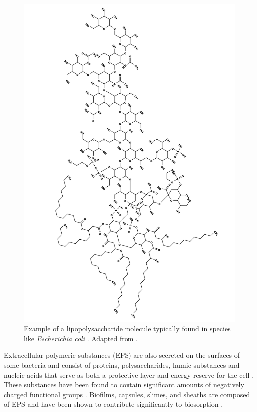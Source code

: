 \begin{figure}[tbph!]
	\centering
	\includegraphics[width=0.9\linewidth]{Theory/Pics/lps}
	\caption{Example of a lipopolysaccharide molecule typically found in species like \textit{Escherichia coli} \parencite{Whitman2010}. Adapted from \textcite{NCIB_lps}.}
	\label{fig:lps}
\end{figure}



Extracellular polymeric substances (EPS) are also secreted on the surfaces of some bacteria and consist of proteins, polysaccharides, humic substances and nucleic acids \parencite{Zhang2017} that serve as both a protective layer and energy reserve for the cell \parencite{Liu2002}. These substances have been found to contain significant amounts of negatively charged functional groups \parencite{Wang2014}. Biofilms, capsules, slimes, and sheaths are composed of EPS and have been shown to contribute significantly to biosorption \parencite{Fomina2014}.


